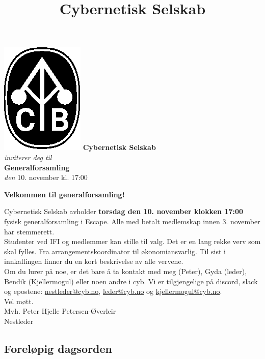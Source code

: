 \documentclass[12pt, norsk, a4paper]{proc}
\title{Cybernetisk Selskab}
\begin{document}
   \begin{strip}
   \begin{center}
   \includegraphics[scale=1, center]{cyb-logo.eps} 
    \Large\textbf{Cybernetisk Selskab}\\
    \textit{inviterer deg til}\\
    \large\textbf{Generalforsamling} \\
    \emph{den} 
    \large 10. november kl. 17:00 \\
   \end{center}
   \end{strip}

\textbf{Velkommen til generalforsamling!}

Cybernetisk Selskab avholder \textbf{torsdag den 10. november klokken 17:00} fysisk generalforsamling i Escape. Alle med betalt medlemskap innen 3.
november har stemmerett.\\

Studenter ved IFI og medlemmer kan stille til valg. Det er en lang rekke verv
som skal fylles. Fra arrangementskoordinator til økonomiansvarlig. Til
sist i innkallingen finner du en kort beskrivelse av alle vervene.\\

Om du lurer på noe, er det bare å ta kontakt med meg (Peter), Gyda (leder),
Bendik (Kjellermogul) eller noen andre i cyb. Vi er tilgjengelige på
discord, slack og epostene: \href{mailto:nestleder@cyb.no}{nestleder@cyb.no}, \href{mailto:leder@cyb.no}{leder@cyb.no} og
\href{mailto:kjellermogul@cyb.no}{kjellermogul@cyb.no}.\\

Vel møtt.\\
Mvh. Peter Hjelle Petersen-Øverleir\\
Nestleder

\hypertarget{foreluxf8pig-dagsorden}{%
\subsection*{Foreløpig dagsorden}\label{foreluxf8pig-dagsorden}}
\end{document}
